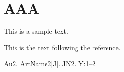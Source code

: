 ﻿\documentclass{article}
\begin{document}
\section{AAA}
This is a sample text.\cite{author1.year1,author2.year2}

This is the text following the reference. 

    \begin{thebibliography}{99} %
        \addtolength{\itemsep}{-2ex} %
        Au2. ArtName2[J]. JN2. Y:1--2
    \end{thebibliography}
\end{document}
